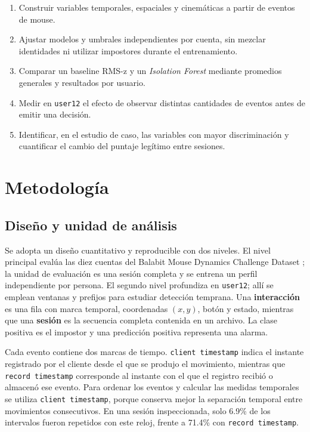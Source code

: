 \documentclass[11pt,letterpaper]{article}
\begin{document}
\begin{enumerate}
  \item Construir variables temporales, espaciales y cinemáticas a partir de eventos de mouse.
  \item Ajustar modelos y umbrales independientes por cuenta, sin mezclar identidades ni utilizar impostores durante
  el entrenamiento.
  \item Comparar un baseline RMS-z y un \emph{Isolation Forest} mediante promedios generales y resultados por usuario.
  \item Medir en \texttt{user12} el efecto de observar distintas cantidades de eventos antes de emitir una decisión.
  \item Identificar, en el estudio de caso, las variables con mayor discriminación y cuantificar el cambio del puntaje
  legítimo entre sesiones.
\end{enumerate}

\section{Metodología}

\subsection{Diseño y unidad de análisis}

Se adopta un diseño cuantitativo y reproducible con dos niveles. El nivel principal evalúa las diez cuentas del
Balabit Mouse Dynamics Challenge Dataset \cite{balabit2016}; la unidad de evaluación es una sesión completa y se
entrena un perfil independiente por persona. El segundo nivel profundiza en \texttt{user12}; allí se emplean ventanas
y prefijos para estudiar detección temprana. Una \textbf{interacción} es una fila con marca temporal, coordenadas
$(x,y)$, botón y estado, mientras que una \textbf{sesión} es la secuencia completa contenida en un archivo. La clase
positiva es el impostor y una predicción positiva representa una alarma.

Cada evento contiene dos marcas de tiempo. \texttt{client timestamp} indica el instante registrado por el cliente
desde el que se produjo el movimiento, mientras que \texttt{record timestamp} corresponde al instante con el que el
registro recibió o almacenó ese evento. Para ordenar los eventos y calcular las medidas temporales se utiliza
\texttt{client timestamp}, porque conserva mejor la separación temporal entre movimientos consecutivos. En una sesión
inspeccionada, solo 6.9\% de los intervalos fueron repetidos con este reloj, frente a 71.4\% con
\texttt{record timestamp}.
\end{document}
